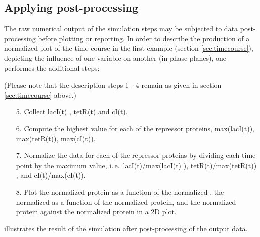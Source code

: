 \subsection{Applying post-processing}
\label{sec:postprocessing}
The raw numerical output of the simulation steps may be subjected to data post-processing before plotting or reporting. In order to describe the production of a normalized plot of the time-course in the first example (section \ref{sec:timecourse}), depicting the influence of one variable on another (in phase-planes), one performes the additional steps:

(Please note that the description steps 1 - 4 remain as given in section \ref{sec:timecourse} above.)
\begin{enumerate}
	\item[5.]{Collect lacI(t) , tetR(t) and cI(t).}
	\item[6.]{Compute the highest value for each of the repressor proteins, max(lacI(t)), max(tetR(t)), max(cI(t)).}
	\item[7.]{Normalize the data for each of the repressor proteins by dividing each time point by the maximum value, i.\,e.\ lacI(t)/max(lacI(t) ), tetR(t)/max(tetR(t)) , and cI(t)/max(cI(t)).}
	\item[8.]{Plot the normalized  protein as a function of the normalized , the normalized   as a function of the normalized  protein, and the normalized  protein against the normalized  protein in a 2D plot.}
\end{enumerate}

 illustrates the result of the simulation after post-processing of the output data. 

